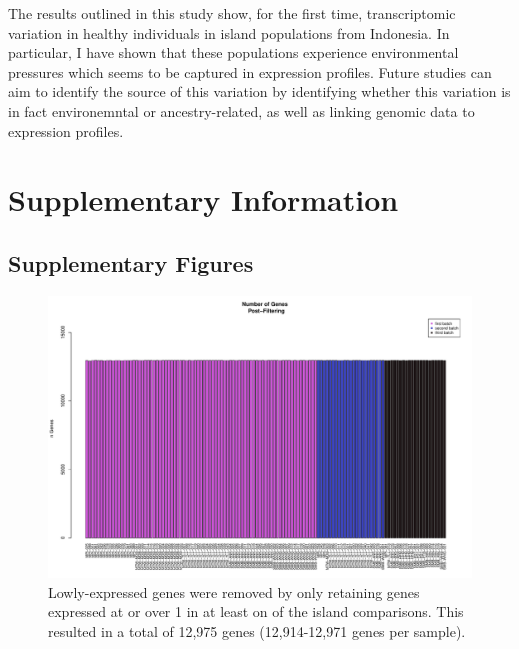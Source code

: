 \documentclass[12pt,a4paper,titlepage,twoside,openright]{book}
\begin{document}
\begin{mainmatter}
{The results outlined in this study show, for the first time, transcriptomic variation in healthy individuals in island populations from Indonesia. In particular, I have shown that these populations experience environmental pressures which seems to be captured in expression profiles. Future studies can aim to identify the source of this variation by identifying whether this variation is in fact environemntal or ancestry-related, as well as linking genomic data to expression profiles. 



\chapter{Supplementary Information}\label{}

\section{Supplementary Figures}

\begin{figure}[htb!]
\centering
\includegraphics[width=\textwidth,height=\textheight,keepaspectratio]{Figures/nGenes_indoRNA_postFiltering_123Combined.pdf}
\caption{Lowly-expressed genes were removed by only retaining genes expressed at or over 1 in at least on of the island comparisons. This resulted in a total of 12,975 genes (12,914-12,971 genes per sample).}
\label{fig:Total Genes Post Filtering}
\end{figure}


}
\end{mainmatter}
\end{document}
